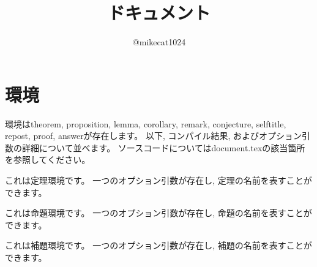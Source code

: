\documentclass[a4paper]{jsarticle}
\title{ドキュメント}
\author{@mikecat1024}
\date{}
\begin{document}
\maketitle


\section{環境}

環境はtheorem, proposition, lemma, corollary, remark, conjecture, selftitle, repost, proof, answerが存在します。
以下, コンパイル結果, およびオプション引数の詳細について並べます。
ソースコードについてはdocument.texの該当箇所を参照してください。
\begin{theorem}[option]
  これは定理環境です。
  一つのオプション引数が存在し, 定理の名前を表すことができます。
\end{theorem}

\begin{proposition}[option]
  これは命題環境です。
  一つのオプション引数が存在し, 命題の名前を表すことができます。
\end{proposition}

\begin{lemma}
  これは補題環境です。
  一つのオプション引数が存在し, 補題の名前を表すことができます。
\end{lemma}

\begin{corollary}
  
\end{corollary}

\begin{remark}
  
\end{remark}

\begin{conjecture}

\end{conjecture}
\end{document}
